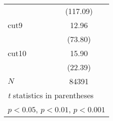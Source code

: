 {\begin{tabular}{l*{1}{c}}
            &    (117.09)         \\
[1em]
cut9        &       12.96\sym{***}\\
            &     (73.80)         \\
[1em]
cut10       &       15.90\sym{***}\\
            &     (22.39)         \\
\hline
\(N\)       &       84391         \\
\hline\hline
\multicolumn{2}{l}{\footnotesize \textit{t} statistics in parentheses}\\
\multicolumn{2}{l}{\footnotesize \sym{*} \(p<0.05\), \sym{**} \(p<0.01\), \sym{***} \(p<0.001\)}\\
\end{tabular}
}
